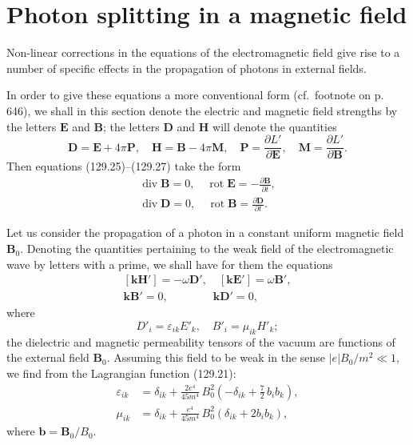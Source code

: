 
\section{Photon splitting in a magnetic field}


Non-linear corrections in the equations of the electromagnetic field give rise to a number of specific effects in the propagation of photons in external fields.

In order to give these equations a more conventional form (cf.\ footnote on p.\,646), we shall in this section denote the electric and magnetic field strengths by the letters $\mathbf{E}$ and $\mathbf{B}$; the letters $\mathbf{D}$ and $\mathbf{H}$ will denote the quantities
\[
\mathbf{D} = \mathbf{E} + 4\pi\mathbf{P},\quad \mathbf{H} = \mathbf{B} - 4\pi\mathbf{M},\quad \mathbf{P} = \frac{\partial L'}{\partial\mathbf{E}},\quad \mathbf{M} = \frac{\partial L'}{\partial\mathbf{B}}.
\]
Then equations (129.25)--(129.27) take the form
\begin{equation}
\begin{gathered}
\operatorname{div}\mathbf{B} = 0,\quad \operatorname{rot}\mathbf{E} = -\frac{\partial\mathbf{B}}{\partial t},\\[4pt]
\operatorname{div}\mathbf{D} = 0,\quad \operatorname{rot}\mathbf{B} = \frac{\partial\mathbf{D}}{\partial t}.
\end{gathered}
\label{eq:130.1}
\end{equation}

Let us consider the propagation of a photon in a constant uniform magnetic field $\mathbf{B}_0$. Denoting the quantities pertaining to the weak field of the electromagnetic wave by letters with a prime, we shall have for them the equations
\begin{equation}
\begin{gathered}
{[\mathbf{k}\mathbf{H}']} = -\omega\mathbf{D}',\quad [\mathbf{k}\mathbf{E}'] = \omega\mathbf{B}',\\[4pt]
\mathbf{k}\mathbf{B}' = 0,\qquad\qquad \mathbf{k}\mathbf{D}' = 0,
\end{gathered}
\label{eq:130.2}
\end{equation}
where
\begin{equation}
D'_i = \varepsilon_{ik}E'_k,\quad B'_i = \mu_{ik}H'_k;
\label{eq:130.3}
\end{equation}
the dielectric and magnetic permeability tensors of the vacuum are functions of the external field $\mathbf{B}_0$. Assuming this field to be weak in the sense $|e|B_0/m^2 \ll 1$, we find from the Lagrangian function (129.21):
\begin{equation}
\begin{aligned}
\varepsilon_{ik} &= \delta_{ik} + \frac{2e^4}{45m^4}\,B_0^2\!\left(-\delta_{ik} + \frac{7}{2}\,b_i b_k\right),\\[6pt]
\mu_{ik} &= \delta_{ik} + \frac{e^4}{45m^4}\,B_0^2\!\left(\delta_{ik} + 2b_i b_k\right),
\end{aligned}
\label{eq:130.4}
\end{equation}
where $\mathbf{b} = \mathbf{B}_0/B_0$.

